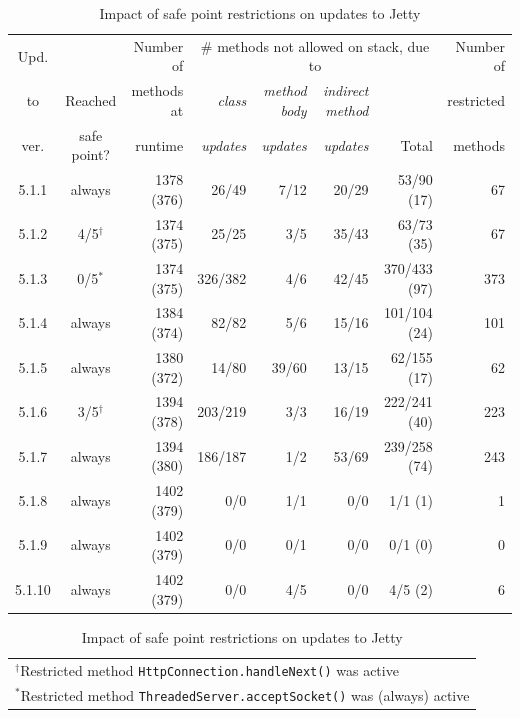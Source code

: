 \begin{table}
\begin{small}
\begin{center}
\begin{tabular}{|c|c|r|rrrr|r|} \hline
Upd.    &                   & Number of  & \multicolumn{4}{c|}{\# methods not allowed on stack, due to}                 & Number of \\
to      & Reached           & methods at & \emph{class}   & \emph{method body} & \emph{indirect method}  &              & restricted \\
ver.    & safe point?       & runtime    & \emph{updates} & \emph{updates}     & \emph{updates}          & Total        & methods   \\ \hline \hline
5.1.1   &  always           & 1378 (376) & 26/49          & 7/12               & 20/29                   & 53/90  (17)  & 67        \\
5.1.2   &  4/5$^\dagger$    & 1374 (375) & 25/25          & 3/5                & 35/43                   & 63/73  (35)  & 67        \\
5.1.3   &  0/5$^*$          & 1374 (375) & 326/382        & 4/6                & 42/45                   & 370/433 (97) & 373       \\
5.1.4   &  always           & 1384 (374) & 82/82          & 5/6                & 15/16                   & 101/104 (24) & 101       \\
5.1.5   &  always           & 1380 (372) & 14/80          & 39/60              & 13/15                   & 62/155 (17)  & 62        \\
5.1.6   &  3/5$^\dagger$    & 1394 (378) & 203/219        & 3/3                & 16/19                   & 222/241 (40) & 223       \\
5.1.7   &  always           & 1394 (380) & 186/187        & 1/2                & 53/69                   & 239/258 (74) & 243       \\
5.1.8   &  always           & 1402 (379) & 0/0            & 1/1                & 0/0                     & 1/1   (1)    & 1         \\
5.1.9   &  always           & 1402 (379) & 0/0            & 0/1                & 0/0                     & 0/1   (0)    & 0         \\
5.1.10  &  always           & 1402 (379) & 0/0            & 4/5                & 0/0                     & 4/5   (2)    & 6         \\ \hline
\end{tabular}
\end{center}
\begin{tabular}{l}
$^\dagger$Restricted method \texttt{HttpConnection.handleNext()} was
active \\
$^*$Restricted method \texttt{ThreadedServer.acceptSocket()} was
(always) active
\end{tabular}
\end{small}
\vspace{1ex}
\caption{Impact of safe point restrictions on updates to Jetty}
\label{tab:inlining}
\end{table}

